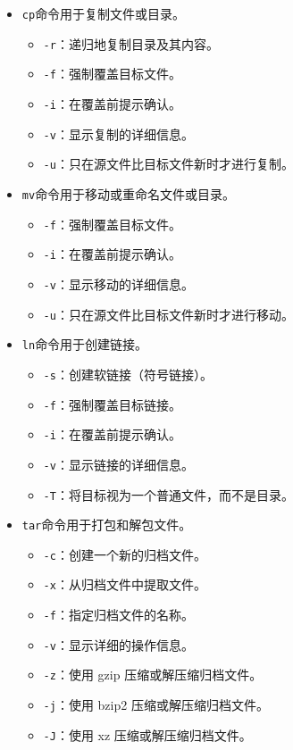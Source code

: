 \documentclass[../main.tex]{subfiles}
\begin{document}
\begin{itemize}
\begin{itemize}
    \item \texttt{cp}命令用于复制文件或目录。
    \begin{itemize}
      \item \texttt{-r}：递归地复制目录及其内容。
      \item \texttt{-f}：强制覆盖目标文件。
      \item \texttt{-i}：在覆盖前提示确认。
      \item \texttt{-v}：显示复制的详细信息。
      \item \texttt{-u}：只在源文件比目标文件新时才进行复制。
    \end{itemize}
    \item \texttt{mv}命令用于移动或重命名文件或目录。
    \begin{itemize}
      \item \texttt{-f}：强制覆盖目标文件。
      \item \texttt{-i}：在覆盖前提示确认。
      \item \texttt{-v}：显示移动的详细信息。
      \item \texttt{-u}：只在源文件比目标文件新时才进行移动。
    \end{itemize}
    \item \texttt{ln}命令用于创建链接。
    \begin{itemize}
      \item \texttt{-s}：创建软链接（符号链接）。
      \item \texttt{-f}：强制覆盖目标链接。
      \item \texttt{-i}：在覆盖前提示确认。
      \item \texttt{-v}：显示链接的详细信息。
      \item \texttt{-T}：将目标视为一个普通文件，而不是目录。
    \end{itemize}
    \item \texttt{tar}命令用于打包和解包文件。
    \begin{itemize}
      \item \texttt{-c}：创建一个新的归档文件。
      \item \texttt{-x}：从归档文件中提取文件。
      \item \texttt{-f}：指定归档文件的名称。
      \item \texttt{-v}：显示详细的操作信息。
      \item \texttt{-z}：使用 gzip 压缩或解压缩归档文件。
      \item \texttt{-j}：使用 bzip2 压缩或解压缩归档文件。
      \item \texttt{-J}：使用 xz 压缩或解压缩归档文件。

\end{itemize}
\end{itemize}
\end{itemize}
\end{document}
